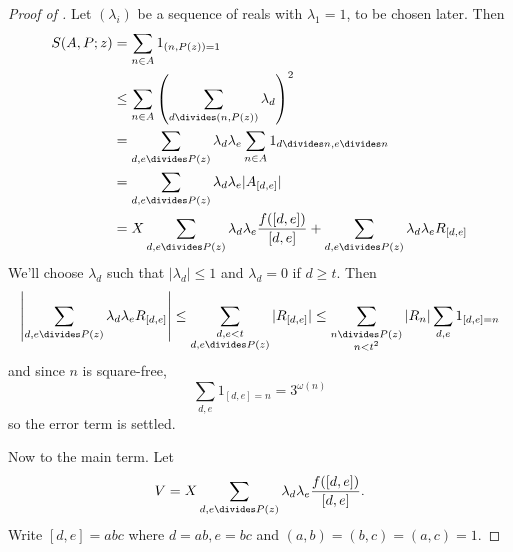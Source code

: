 \documentclass[a4paper]{article}
\begin{document}
\begin{proof}[Proof of ]
  Let \((\lambda_i)\) be a sequence of reals with \(\lambda_1 = 1\), to be chosen later. Then
  \begin{align*}
    S(A, P; z)
    &= \sum_{n \in A} 1_{(n, P(z)) = 1} \\
    &\leq \sum_{n \in A} \left( \sum_{d \divides (n, P(z))} \lambda_d \right)^2 \\
    &= \sum_{d, e \divides P(z)} \lambda_d \lambda_e \sum_{n \in A} 1_{d \divides n, e \divides n} \\
    &= \sum_{d, e \divides P(z)} \lambda_d \lambda_e |A_{[d, e]}| \\
    &= X \sum_{d, e \divides P(z)} \lambda_d \lambda_e \frac{f([d, e])}{[d, e]} + \sum_{d, e \divides P(z)} \lambda_d \lambda_e R_{[d, e]}
  \end{align*}
  We'll choose \(\lambda_d\) such that \(|\lambda_d| \leq 1\) and \(\lambda_d = 0\) if \(d \geq t\). Then
  \[
    \left| \sum_{d, e \divides P(z)} \lambda_d \lambda_e R_{[d, e]} \right|
    \leq \sum_{\substack{d, e < t \\ d, e \divides P(z)}} |R_{[d, e]}|
    \leq \sum_{\substack{n \divides P(z) \\ n < t^2}} |R_n| \sum_{d, e} 1_{[d, e] = n}
  \]
  and since \(n\) is square-free,
  \[
    \sum_{d, e} 1_{[d, e] = n} = 3^{\omega(n)}
  \]
  so the error term is settled.

  Now to the main term. Let
  \[
    V = X \sum_{d, e \divides P(z)} \lambda_d \lambda_e \frac{f([d, e])}{[d, e]}.
  \]
  Write \([d, e] = abc\) where \(d = ab, e = bc\) and \((a, b) = (b, c) = (a, c) = 1\).
\end{proof}











\printindex
\end{document}
